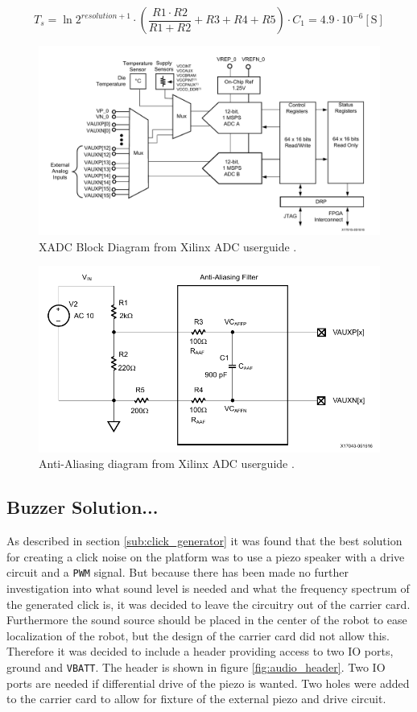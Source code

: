 \begin{equation}
	\label{eq:aliasing}
	T_{s}=\ln{2^{resolution+1}}\cdot \left(\frac{R1\cdot R2}{R1 + R2}+R3+R4+R5\right)\cdot C_1 = 4.9\cdot 10^{-6}[\text{S}]
\end{equation}

\begin{figure}
	\centering
	\includegraphics[width=1\linewidth]{graphics/adc.pdf}
	\caption{XADC Block Diagram from Xilinx ADC userguide \cite{adc}.}
	\label{fig:adc}
\end{figure}

\begin{figure}
	\centering
	\includegraphics[width=0.6\linewidth]{graphics/anti_aliasing.pdf}
	\caption{Anti-Aliasing diagram from Xilinx ADC userguide \cite{adc}.}
	\label{fig:anti_a}
\end{figure}

\subsection{Buzzer Solution...}
As described in section \ref{sub:click_generator} it was found that the best solution for creating a click noise on the platform was to use a piezo speaker with a drive circuit and a \texttt{PWM} signal.
But because there has been made no further investigation into what sound level is needed and what the frequency spectrum of the generated click is, it was decided to leave the circuitry out of the carrier card.
Furthermore the sound source should be placed in the center of the robot to ease localization of the robot, but the design of the carrier card did not allow this.
Therefore it was decided to include a header providing access to two IO ports, ground and \texttt{VBATT}.
The header is shown in figure \ref{fig:audio_header}.
Two IO ports are needed if differential drive of the piezo is wanted.
Two holes were added to the carrier card to allow for fixture of the external piezo and drive circuit.

